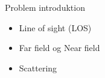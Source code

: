 \begin{frame}{Problem introduktion}
\begin{minipage}{0.5\textwidth}

\begin{itemize}
\item Line of sight (LOS)
\item Far field og Near field
\item Scattering
\end{itemize}

\end{minipage}
\begin{minipage}{0.45\textwidth}


\end{minipage}
\end{frame} 
 
 
